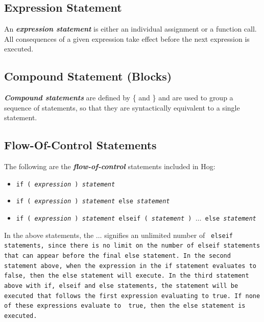 \documentclass{report}
\begin{document}
\subsection{Expression Statement} %
\label{sub:expression_statement}

An \textbf{\emph{expression statement}} is either an individual assignment or a
function call. All consequences of a given expression take effect before the next
expression is executed.


\subsection{Compound Statement (Blocks)} %
\label{sub:compound_statement}

\textbf{\emph{Compound statements}} are defined by \{ and \} and are used to
group a sequence of statements, so that they are syntactically equivalent to a
single statement.


\subsection{Flow-Of-Control Statements} %
\label{sub:flow_of_control_statements}

The following are the \textbf{\emph{flow-of-control}} statements included in Hog:

\begin{itemize}
  \item[] \tt if ( \rm \emph{expression} \tt ) \rm \emph{statement}
  \item[] \tt if ( \rm \emph{expression} \tt ) \rm \emph{statement} \tt else \rm \emph{statement}
  \item[] \tt if ( \rm \emph{expression} \tt ) \rm \emph{statement} \tt elseif ( \rm \emph{statement} \tt ) $\dots$ else 
  \rm \emph{statement}
\end{itemize}

In the above statements, the  $\dots$ signifies an unlimited number of \tt
elseif \rm statements, since there is no limit on the number of \tt elseif \rm
statements that can appear before the final \tt else \rm statement. In the
second statement above, when the expression in the \tt if \rm statement
evaluates to \tt false\rm, then the \tt else \rm statement will execute. In the
third statement above with \tt if\rm, \tt elseif \rm and \tt else \rm
statements, the statement will be executed that follows the first expression
evaluating to \tt true\rm. If none of these expressions evaluate to \tt
true\rm, then the \tt else \rm statement is executed.
\end{document}

